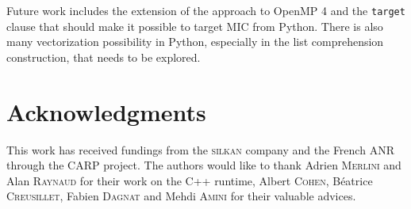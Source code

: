 \documentclass{llncs}
\begin{document}
Future work includes the extension of the approach to OpenMP 4 and the
\texttt{target} clause that should make it possible to target MIC from Python.
There is also many vectorization possibility in Python, especially in the list
comprehension construction, that needs to be explored.

\section*{Acknowledgments}

This work has received fundings from the \textsc{silkan} company and the French
ANR through the CARP project. The authors would like to thank Adrien
\textsc{Merlini} and Alan \textsc{Raynaud} for their work on the C++ runtime,
Albert \textsc{Cohen}, B{\'e}atrice \textsc{Creusillet}, Fabien
\textsc{Dagnat} and Mehdi \textsc{Amini} for their valuable advices.



\end{document}
